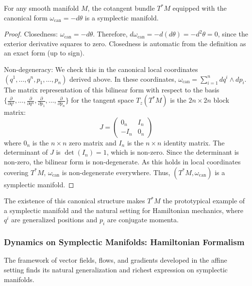 \begin{theorem}
For any smooth manifold $M$, the cotangent bundle $T^*M$ equipped with the canonical form $\omega_{\text{can}} = -d\theta$ is a symplectic manifold.
\end{theorem}
\begin{proof}
Closedness: $\omega_{\text{can}} = -d\theta$. Therefore, $d\omega_{\text{can}} = -d(d\theta) = -d^2\theta = 0$, since the exterior derivative squares to zero. Closedness is automatic from the definition as an exact form (up to sign).

Non-degeneracy: We check this in the canonical local coordinates $(q^1, \dots, q^n, p_1, \dots, p_n)$ derived above. In these coordinates, $\omega_{\text{can}} = \sum_{i=1}^n dq^i \wedge dp_i$. The matrix representation of this bilinear form with respect to the basis $\{\frac{\partial}{\partial q^1}, \dots, \frac{\partial}{\partial q^n}, \frac{\partial}{\partial p_1}, \dots, \frac{\partial}{\partial p_n}\}$ for the tangent space $T_z(T^*M)$ is the $2n \times 2n$ block matrix:
    \[ J = \begin{pmatrix} 0_n & I_n \\ -I_n & 0_n \end{pmatrix} \]
    where $0_n$ is the $n \times n$ zero matrix and $I_n$ is the $n \times n$ identity matrix. The determinant of $J$ is $\det(I_n) = 1$, which is non-zero. Since the determinant is non-zero, the bilinear form is non-degenerate. As this holds in local coordinates covering $T^*M$, $\omega_{\text{can}}$ is non-degenerate everywhere.
Thus, $(T^*M, \omega_{\text{can}})$ is a symplectic manifold.
\end{proof}

The existence of this canonical structure makes $T^*M$ the prototypical example of a symplectic manifold and the natural setting for Hamiltonian mechanics, where $q^i$ are generalized positions and $p_i$ are conjugate momenta.

\subsubsection{Dynamics on Symplectic Manifolds: Hamiltonian Formalism}

The framework of vector fields, flows, and gradients developed in the affine setting finds its natural generalization and richest expression on symplectic manifolds.

